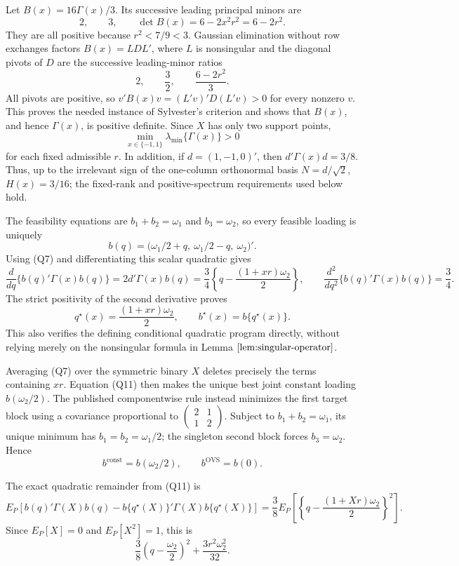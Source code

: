 Let \(B(x)=16\Gamma(x)/3\).  Its successive leading principal minors are
\[
 2,\qquad 3,\qquad \det B(x)=6-2x^2r^2=6-2r^2.
\tag{Q8}
\]
They are all positive because \(r^2<7/9<3\).  Gaussian elimination without row exchanges factors \(B(x)=L D L'\), where \(L\) is nonsingular and the diagonal pivots of \(D\) are the successive leading-minor ratios
\[
 2,\qquad \frac32,\qquad \frac{6-2r^2}{3}.
\]
All pivots are positive, so \(v'B(x)v=(L'v)'D(L'v)>0\) for every nonzero \(v\).  This proves the needed instance of Sylvester's criterion and shows that \(B(x)\), and hence \(\Gamma(x)\), is positive definite.  Since \(X\) has only two support points,
\[
 \min_{x\in\{-1,1\}}\lambda_{\min}\{\Gamma(x)\}>0
\tag{Q9}
\]
for each fixed admissible \(r\).  In addition, if \(d=(1,-1,0)'\), then \(d'\Gamma(x)d=3/8\).  Thus, up to the irrelevant sign of the one-column orthonormal basis \(N=d/\sqrt2\), \(H(x)=3/16\); the fixed-rank and positive-spectrum requirements used below hold.

The feasibility equations are \(b_1+b_2=\omega_1\) and \(b_3=\omega_2\), so every feasible loading is uniquely
\[
 b(q)=\bigl(\omega_1/2+q,\ \omega_1/2-q,\ \omega_2\bigr)'.
\tag{Q10}
\]
Using (Q7) and differentiating this scalar quadratic gives
\[
 \frac{d}{dq}\{b(q)'\Gamma(x)b(q)\}
 =2d'\Gamma(x)b(q)
 =\frac34\left\{q-\frac{(1+xr)\omega_2}{2}\right\},
 \qquad
 \frac{d^2}{dq^2}\{b(q)'\Gamma(x)b(q)\}=\frac34.
\tag{Q11}
\]
The strict positivity of the second derivative proves
\[
 q^\star(x)=\frac{(1+xr)\omega_2}{2},
 \qquad b^\star(x)=b\{q^\star(x)\}.
\tag{Q12}
\]
This also verifies the defining conditional quadratic program directly, without relying merely on the nonsingular formula in Lemma \(\ref{lem:singular-operator}\).

Averaging (Q7) over the symmetric binary \(X\) deletes precisely the terms containing \(xr\).  Equation (Q11) then makes the unique best joint constant loading \(b(\omega_2/2)\).  The published componentwise rule instead minimizes the first target block using a covariance proportional to
\(\left(\begin{smallmatrix}2&1\\1&2\end{smallmatrix}\right)\).  Subject to \(b_1+b_2=\omega_1\), its unique minimum has \(b_1=b_2=\omega_1/2\); the singleton second block forces \(b_3=\omega_2\).  Hence
\[
 b^{\mathrm{const}}=b(\omega_2/2),
 \qquad b^{\mathrm{OVS}}=b(0).
\tag{Q13}
\]

The exact quadratic remainder from (Q11) is
\[
 E_P\!\left[b(q)'\Gamma(X)b(q)
 -b\{q^\star(X)\}'\Gamma(X)b\{q^\star(X)\}\right]
 =\frac38E_P\!\left[\left\{q-\frac{(1+Xr)\omega_2}{2}\right\}^2\right].
\tag{Q14}
\]
Since \(E_P[X]=0\) and \(E_P[X^2]=1\), this is
\[
 \frac38\left(q-\frac{\omega_2}{2}\right)^2
 +\frac{3r^2\omega_2^2}{32}.
\tag{Q15}
\]

